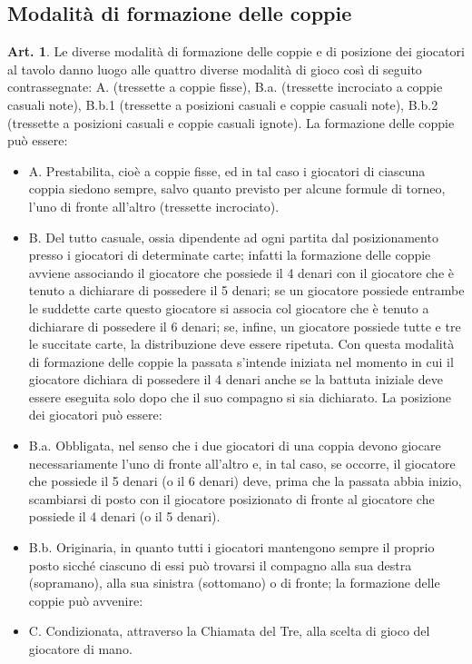 \documentclass[italian,a4paper]{book}
\theoremstyle{definition}
\newtheorem{art}{Art.}
\newenvironment{packeditem}{
\begin{itemize}
  \setlength{\itemsep}{1pt}
  \setlength{\parskip}{0pt}
  \setlength{\parsep}{0pt}
}{\end{itemize}}
\begin{document}
\subsection{Modalità di formazione delle coppie}
\begin{art}
Le diverse modalità di formazione delle coppie e di posizione dei giocatori
al tavolo danno luogo alle quattro diverse modalità di gioco così di seguito
contrassegnate: A. (tressette a coppie fisse), B.a. (tressette incrociato a coppie casuali note), B.b.1 (tressette a posizioni casuali e coppie casuali note), B.b.2 (tressette a posizioni casuali e coppie casuali ignote).
La formazione delle coppie può essere:
\begin{packeditem}
\item       A. Prestabilita, cioè a coppie fisse, ed in tal caso i giocatori di ciascuna coppia siedono sempre, salvo quanto previsto per alcune formule di torneo, l'uno di fronte all'altro (tressette incrociato).
\item       B. Del tutto casuale, ossia dipendente ad ogni partita dal posizionamento presso i giocatori di determinate carte; infatti la formazione delle coppie avviene associando il giocatore che possiede il 4 denari con il giocatore che è tenuto a dichiarare di possedere il 5 denari; se un giocatore possiede entrambe le suddette carte questo giocatore si associa col giocatore che è tenuto a dichiarare di possedere il 6 denari; se, infine, un giocatore possiede tutte e tre le succitate carte, la distribuzione deve essere ripetuta. Con questa modalità di formazione delle coppie la passata s'intende iniziata nel momento in cui il giocatore dichiara di possedere il 4 denari anche se la battuta iniziale deve essere eseguita solo dopo che il suo compagno si sia dichiarato. La posizione dei giocatori può essere:
\item B.a. Obbligata, nel senso che i due giocatori di una coppia devono giocare necessariamente l'uno di fronte all'altro e, in tal caso, se occorre, il giocatore che possiede il 5 denari (o il 6 denari) deve, prima che la passata abbia inizio, scambiarsi di posto con il giocatore posizionato di fronte al giocatore che possiede il 4 denari (o il 5 denari).
\item  B.b. Originaria, in quanto tutti i giocatori mantengono sempre il proprio posto sicché ciascuno di essi può trovarsi il compagno alla sua destra (sopramano), alla sua sinistra (sottomano) o di fronte; la formazione delle coppie può avvenire:
\item   C. Condizionata, attraverso la Chiamata del Tre, alla scelta di gioco del giocatore di mano.
    \end{packeditem}
\end{art}
\end{document}
